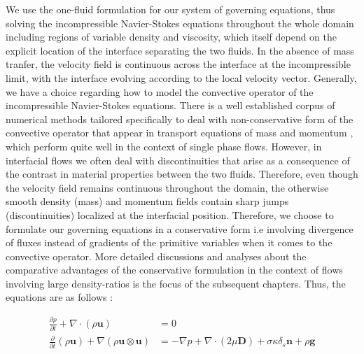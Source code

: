 We use the one-fluid formulation for our system of governing equations, thus solving 
the incompressible Navier-Stokes equations throughout the whole domain including regions 
of variable density and viscosity, which itself depend on the explicit 
location of the interface separating the two fluids.
In the absence of mass tranfer, the velocity field is continuous across
the interface at the incompressible limit, with the interface evolving according to the local velocity vector.  
Generally, we have a choice regarding how to model the convective operator
of the incompressible Navier-Stokes equations. There is a well established corpus of 
numerical methods tailored specifically to deal with non-conservative 
 form of the convective 
operator that appear in transport equations of mass and momentum 
, which perform quite well in the context of single phase flows.
However, in interfacial flows we often deal with discontinuities that arise as a consequence
of the contrast in material properties between the two fluids. Therefore, even though the velocity field
remains continuous throughout the domain, the otherwise smooth density (mass) and momentum fields 
contain sharp jumps (discontinuities) localized at the interfacial position.     
Therefore, we choose to formulate our governing equations in a conservative form i.e involving divergence of fluxes instead of gradients of the primitive variables when it comes to the convective operator. More detailed discussions and analyses about the comparative advantages of the conservative formulation in the context of flows involving large density-ratios is the focus of the subsequent chapters. Thus, the equations are as follows :  




\begin{align} 
	\frac{\partial \rho}{\partial t} + \nabla\cdot \left(\rho\boldsymbol{u}\right) &= 0 \nonumber \\
	\frac{\partial}{\partial t} \left(\rho\boldsymbol{u}\right) + \nabla\left(\rho\boldsymbol{u}\otimes\boldsymbol{u}\right)  &= -\nabla p + \nabla \cdot \left(2 \mu \boldsymbol{D}\right) + \sigma \kappa \delta_{s}\boldsymbol{n} + \rho \boldsymbol{g}
\label{nseqn}
\end{align}


